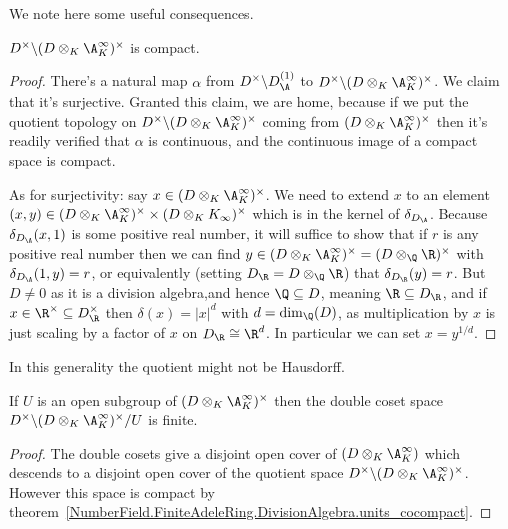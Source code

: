 We note here some useful consequences.

\begin{theorem}
  \label{NumberField.FiniteAdeleRing.DivisionAlgebra.units_cocompact}
  \leanok
  $D^\times\backslash(D\otimes_K\A_K^\infty)^\times$ is compact.
\end{theorem}
\begin{proof}
  \leanok
There's a natural map $\alpha$ from $D^\times\backslash D_{\A}^{(1)}$ to
  $D^\times\backslash (D\otimes_K \A_K^\infty)^\times$. We claim that it's
  surjective. Granted this claim, we are home, because if we put the quotient
  topology on $D^\times\backslash (D\otimes_K \A_K^\infty)^\times$ coming from
  $(D\otimes_K \A_K^\infty)^\times$ then it's readily verified that $\alpha$
  is continuous, and the continuous image of a compact space is compact.

  As for surjectivity: say $x\in (D\otimes_K \A_K^\infty)^\times$. We need to extend
  $x$ to an element $(x,y)\in (D\otimes_K \A_K^\infty)^\times\times(D\otimes_K K_\infty)^\times$
  which is in the kernel of $\delta_{D_{\A}}$. Because $\delta_{D_{\A}}(x,1)$ is some positive
  real number, it will suffice to show that if $r$ is any positive real number then we can
  find $y\in (D\otimes_K \A_K^\infty)^\times=(D\otimes_{\Q}\R)^\times$ with $\delta_{D_{\A}}(1,y)=r$,
  or equivalently (setting $D_{\R}=D\otimes_{\Q}\R$) that $\delta_{D_{\R}}(y)=r$.
  But $D\not=0$ as it is a division algebra,and hence $\Q\subseteq D$, meaning
  $\R\subseteq D_{\R}$, and if
  $x\in\R^\times\subseteq D_{\R}^\times$ then $\delta(x)=|x|^d$ with $d=\dim_{\Q}(D)$,
  as multiplication by $x$ is just scaling by a factor of $x$ on $D_{\R}\cong\R^d$.
  In particular we can set $x=y^{1/d}$.
\end{proof}
\begin{remark} In this generality the quotient might not be Hausdorff.
\end{remark}

\begin{theorem}
  \label{NumberField.FiniteAdeleRing.DivisionAlgebra.finiteDoubleCoset}
  \leanok
  If $U$ is an open subgroup of $(D\otimes_K \A_K^\infty)^\times$
  then the double coset space $D^\times\backslash(D\otimes_K \A_K^\infty)^\times/U$ is finite.
\end{theorem}
\begin{proof}
  \leanok
  The double cosets give a disjoint open cover of $(D\otimes_K \A_K^\infty)$
  which descends to a disjoint open cover of the quotient space
  $D^\times\backslash(D\otimes_K \A_K^\infty)^\times$. However this space is compact
  by theorem~\ref{NumberField.FiniteAdeleRing.DivisionAlgebra.units_cocompact}.
\end{proof}
